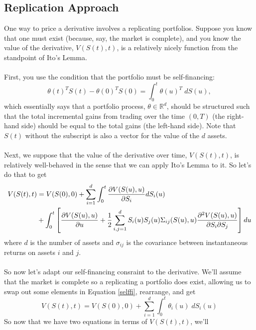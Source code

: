 \documentclass[12pt]{article}
\theoremstyle{plain}
\theoremstyle{definition}
\theoremstyle{remark}
\begin{document}
\subsection{Replication Approach}

One way to price a derivative involves a replicating portfolios.
Suppose you know that one must exist (because, say, the market is 
complete), and you know the value of the derivative, $V(S(t),t)$, is a
relatively nicely function from the standpoint of Ito's Lemma.
\\
\\
First, you use the condition that the portfolio must be
self-financing:
\begin{equation}
   \label{selffi}
   \theta(t)^TS(t) - \theta(0)^TS(0) = \int^t_0 \theta(u)^T \; dS(u),
\end{equation}
which essentially says that a portfolio process, 
$\theta \in \mathbb{R}^d$, should be structured such that the total
incremental gains from trading over the time $(0,T)$ (the right-hand
side) should be equal to the total gains (the left-hand side). Note
that $S(t)$ without the subscript is also a vector for the value of the
$d$ assets.
\\
\\
Next, we suppose that the value of the derivative over time, $V(S(t),t)$,
is relatively well-behaved in the sense that we can apply Ito's Lemma
to it. So let's do that to get
\begin{align}
   \label{itopde}
   V(S(t),t) &= V(S(0),0) + 
   \sum^d_{i=1} \int^t_0 \frac{\partial V(S(u),u)}{\partial S_i} dS_i(u)
   \notag\\
   &+ \int_0^t \left[ \frac{\partial V(S(u),u)}{\partial u} 
   + \frac{1}{2} \sum^d_{i,j =1} S_i(u)S_j(u) \Sigma_{ij}(S(u),u)
   \frac{\partial^2 V(S(u),u)}{\partial S_i \partial S_j} \right] du
\end{align}
where $d$ is the number of assets and $\sigma_{ij}$ is the covariance
between instantaneous returns on assets $i$ and $j$.
\\
\\
So now let's adapt our self-financing consraint to the derivative.
We'll assume that the market is complete so a replicating a portfolio
does exist, allowing us to swap out some elements in Equation 
\ref{selffi}, rearrange, and get
\begin{equation}
   \label{newsf} 
   V(S(t),t) = V(S(0),0) + \sum_{i=1}^d \int_0^t \theta_i(u) \; dS_i(u)
\end{equation}
So now that we have two equations in terms of $V(S(t),t)$, we'll 
\end{document}
